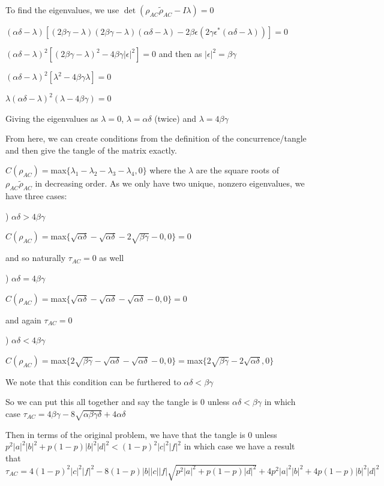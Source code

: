 \documentclass[12pt,a4paper]{article}
\numberwithin{equation}{section}
\begin{document}
To find the eigenvalues, we use $\det(\rho_{AC}\tilde{\rho}_{AC} - I\lambda) = 0$

$(\alpha\delta - \lambda)[(2\beta\gamma - \lambda)(2\beta\gamma - \lambda)(\alpha\delta - \lambda) - 2\beta\epsilon(2\gamma\epsilon^*(\alpha\delta - \lambda))] = 0$

$(\alpha\delta - \lambda)^2[(2\beta\gamma - \lambda)^2 - 4\beta\gamma|\epsilon|^2] = 0$ and then as $|\epsilon|^2 = \beta\gamma$

$(\alpha\delta - \lambda)^2[\lambda^2 - 4\beta\gamma\lambda] = 0$

$\lambda(\alpha\delta - \lambda)^2(\lambda - 4\beta\gamma) = 0$

Giving the eigenvalues as $\lambda = 0$, $\lambda = \alpha\delta$ (twice) and $\lambda = 4\beta\gamma$

From here, we can create conditions from the definition of the concurrence/tangle and then give the tangle of the matrix exactly.

$C(\rho_{AC}) = $max$\{\lambda_1-\lambda_2-\lambda_3-\lambda_4,0\}$ where the $\lambda$ are the square roots of $\rho_{AC}\tilde{\rho}_{AC}$ in decreasing order. As we only have two unique, nonzero eigenvalues, we have three cases:

) $\alpha\delta > 4\beta\gamma$

$C(\rho_{AC}) = $max$\{\sqrt{\alpha\delta} - \sqrt{\alpha\delta} - 2\sqrt{\beta\gamma} - 0,0\} = 0$

and so naturally $\tau_{AC} = 0$ as well

) $\alpha\delta = 4\beta\gamma$

$C(\rho_{AC}) = $max$\{\sqrt{\alpha\delta} - \sqrt{\alpha\delta} - \sqrt{\alpha\delta} - 0,0\} = 0$

and again $\tau_{AC} = 0$

) $\alpha\delta < 4\beta\gamma$

$C(\rho_{AC}) = $max$\{2\sqrt{\beta\gamma} - \sqrt{\alpha\delta} - \sqrt{\alpha\delta} - 0,0\} = $max$\{2\sqrt{\beta\gamma} - 2\sqrt{\alpha\delta},0\}$

We note that this condition can be furthered to $\alpha\delta < \beta\gamma$

So we can put this all together and say the tangle is $0$ unless $\alpha\delta < \beta\gamma$ in which case $\tau_{AC} = 4\beta\gamma - 8\sqrt{\alpha\beta\gamma\delta} + 4\alpha\delta$

Then in terms of the original problem, we have that the tangle is $0$ unless $p^2|a|^2|b|^2 + p(1-p)|b|^2|d|^2 < (1-p)^2|c|^2|f|^2$ in which case we have a result that $\tau_{AC} = 4(1-p)^2|c|^2|f|^2 - 8(1-p)|b||c||f|\sqrt{p^2|a|^2 + p(1-p)|d|^2} +4p^2|a|^2|b|^2 + 4p(1-p)|b|^2|d|^2$
\end{document}
